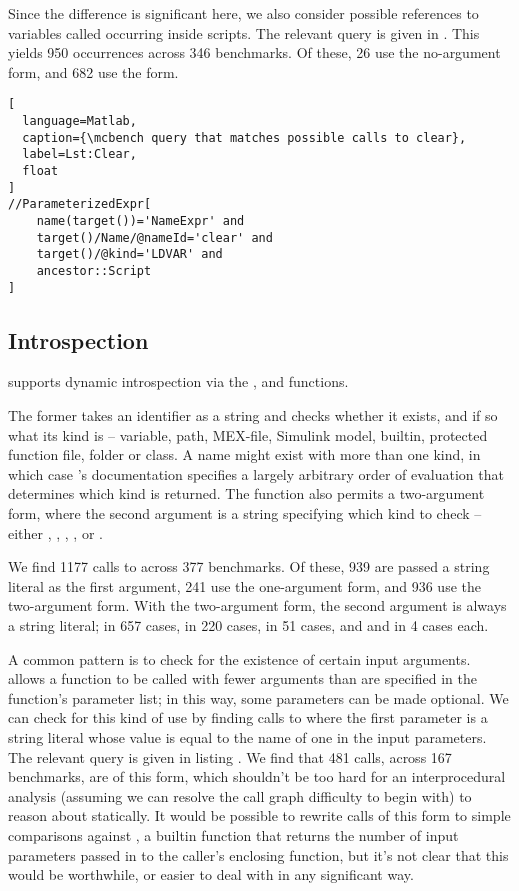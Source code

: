 Since the difference is significant here, we also consider possible references
to variables called  occurring inside scripts. The relevant query
is given in . This yields 950 occurrences across
346 benchmarks. Of these, 26 use the no-argument form, and 682 use the
 form.

\begin{lstlisting}[
  language=Matlab,
  caption={\mcbench query that matches possible calls to clear},
  label=Lst:Clear,
  float
]
//ParameterizedExpr[
    name(target())='NameExpr' and
    target()/Name/@nameId='clear' and
    target()/@kind='LDVAR' and
    ancestor::Script
]
\end{lstlisting}

\subsection{Introspection}

\matlab supports dynamic introspection via the ,  and
 functions.

The former takes an identifier as a string and checks whether it exists, and if
so what its kind is -- variable, path, MEX-file, Simulink model, builtin,
protected function file, folder or class. A name might exist with more than one
kind, in which case \matlab's documentation specifies a largely arbitrary order
of evaluation that determines which kind is returned. The function also permits
a two-argument form, where the second argument is a string specifying which
kind to check -- either , , ,
, or .

We find 1177 calls to  across 377 benchmarks. Of these, 939 are
passed a string literal as the first argument, 241 use the one-argument form,
and 936 use the two-argument form. With the two-argument form, the second
argument is always a string literal;  in 657 cases, 
in 220 cases,  in 51 cases, and  and 
in 4 cases each.

A common pattern is to check for the existence of certain input arguments.
\matlab allows a function to be called with fewer arguments than are specified
in the function's parameter list; in this way, some parameters can be made
optional. We can check for this kind of use by finding calls to 
where the first parameter is a string literal whose value is equal to the name
of one in the input parameters. The relevant query is given in listing
. We find that 481 calls, across 167 benchmarks,
are of this form, which shouldn't be too hard for an interprocedural analysis
(assuming we can resolve the call graph difficulty to begin with) to reason
about statically. It would be possible to rewrite calls of this form to simple
comparisons against , a builtin \matlab function that returns the
number of input parameters passed in to the caller's enclosing function, but
it's not clear that this would be worthwhile, or easier to deal with in any
significant way.

